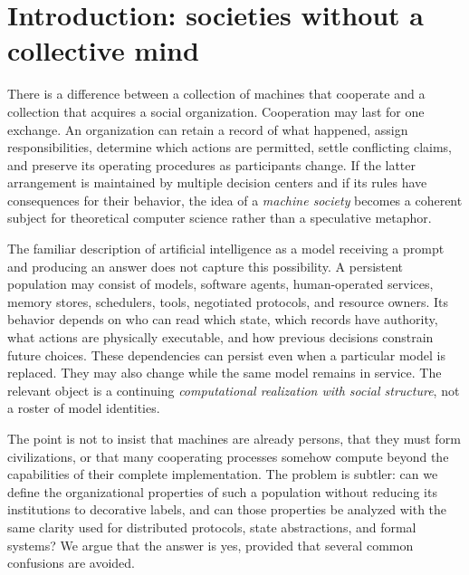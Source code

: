 \documentclass[11pt,letterpaper]{article}
\theoremstyle{plain}
\theoremstyle{definition}
\theoremstyle{remark}
\begin{document}
\hypersetup{pageanchor=true}
\begingroup\small\setlength{\parskip}{0pt}\tableofcontents\endgroup\clearpage
{}
\section{Introduction: societies without a collective mind}\label{sec:introduction}

There is a difference between a collection of machines that cooperate and a collection that acquires a social organization. Cooperation may last for one exchange. An organization can retain a record of what happened, assign responsibilities, determine which actions are permitted, settle conflicting claims, and preserve its operating procedures as participants change. If the latter arrangement is maintained by multiple decision centers and if its rules have consequences for their behavior, the idea of a \emph{machine society} becomes a coherent subject for theoretical computer science rather than a speculative metaphor.

The familiar description of artificial intelligence as a model receiving a prompt and producing an answer does not capture this possibility. A persistent population may consist of models, software agents, human-operated services, memory stores, schedulers, tools, negotiated protocols, and resource owners. Its behavior depends on who can read which state, which records have authority, what actions are physically executable, and how previous decisions constrain future choices. These dependencies can persist even when a particular model is replaced. They may also change while the same model remains in service. The relevant object is a continuing \emph{computational realization with social structure}, not a roster of model identities.

The point is not to insist that machines are already persons, that they must form civilizations, or that many cooperating processes somehow compute beyond the capabilities of their complete implementation. The problem is subtler: can we define the organizational properties of such a population without reducing its institutions to decorative labels, and can those properties be analyzed with the same clarity used for distributed protocols, state abstractions, and formal systems? We argue that the answer is yes, provided that several common confusions are avoided.
\end{document}
